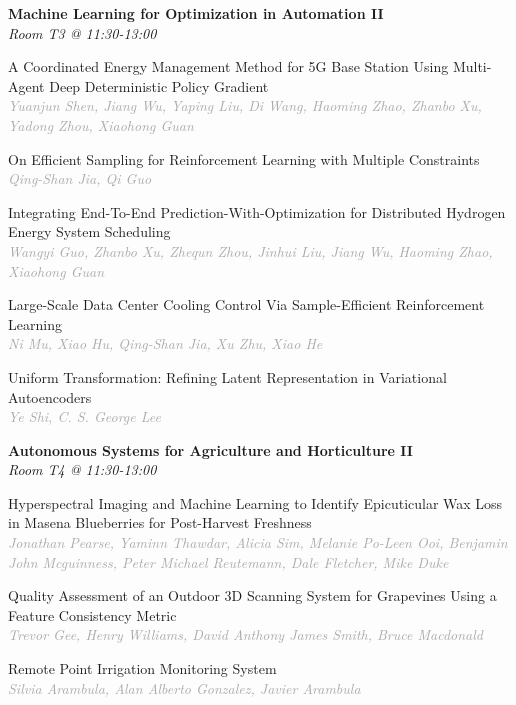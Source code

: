 \begin{multicols*}{2}
\normalsize \textbf{Machine Learning for Optimization in Automation II}\\
\small \textit{Room T3 @ 11:30-13:00}

\small A Coordinated Energy Management Method for 5G Base Station Using Multi-Agent Deep Deterministic Policy Gradient\\ 
\footnotesize \textcolor{darkgray}{\textit{Yuanjun Shen, Jiang  Wu, Yaping  Liu, Di  Wang, Haoming  Zhao, Zhanbo  Xu, Yadong  Zhou, Xiaohong  Guan}}

\small On Efficient Sampling for Reinforcement Learning with Multiple Constraints\\ 
\footnotesize \textcolor{darkgray}{\textit{Qing-Shan Jia, Qi  Guo}}

\small Integrating End-To-End Prediction-With-Optimization for Distributed Hydrogen Energy System Scheduling\\ 
\footnotesize \textcolor{darkgray}{\textit{Wangyi Guo, Zhanbo  Xu, Zhequn  Zhou, Jinhui  Liu, Jiang  Wu, Haoming  Zhao, Xiaohong  Guan}}

\small Large-Scale Data Center Cooling Control Via Sample-Efficient Reinforcement Learning\\ 
\footnotesize \textcolor{darkgray}{\textit{Ni Mu, Xiao  Hu, Qing-Shan  Jia, Xu  Zhu, Xiao  He}}

\small Uniform Transformation: Refining Latent Representation in Variational Autoencoders\\ 
\footnotesize \textcolor{darkgray}{\textit{Ye Shi, C. S. George  Lee}}

\normalsize \textbf{Autonomous Systems for Agriculture and Horticulture II}\\
\small \textit{Room T4 @ 11:30-13:00}

\small Hyperspectral Imaging and Machine Learning to Identify Epicuticular Wax Loss in Masena Blueberries for Post-Harvest Freshness\\ 
\footnotesize \textcolor{darkgray}{\textit{Jonathan Pearse, Yaminn  Thawdar, Alicia  Sim, Melanie Po-Leen  Ooi, Benjamin John  Mcguinness, Peter Michael  Reutemann, Dale  Fletcher, Mike  Duke}}

\small Quality Assessment of an Outdoor 3D Scanning System for Grapevines Using a Feature Consistency Metric\\ 
\footnotesize \textcolor{darkgray}{\textit{Trevor Gee, Henry  Williams, David Anthony James  Smith, Bruce  Macdonald}}

\small Remote Point Irrigation Monitoring System\\ 
\footnotesize \textcolor{darkgray}{\textit{Silvia Arambula, Alan Alberto  Gonzalez, Javier  Arambula}}


\end{multicols*}
